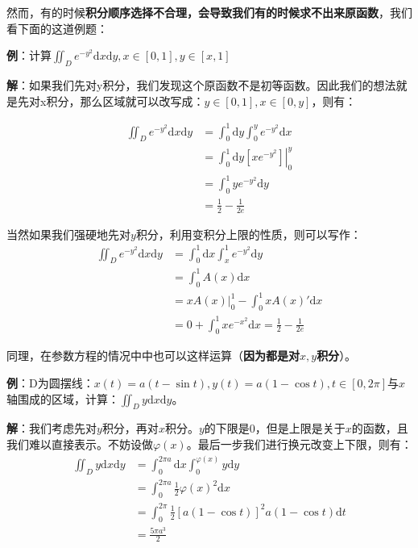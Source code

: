 \documentclass{ctexart}
\let\oldtextbf\textbf
\renewcommand{\textbf}[1]{\textcolor{brown!50!red}{\oldtextbf{#1}}}
\begin{document}
然而，有的时候\textbf{积分顺序选择不合理，会导致我们有的时候求不出来原函数}，我们看下面的这道例题：

\textbf{\color{brown!50!red}例}：计算$\iint_D e^{-y^2}\mathrm{d}x\mathrm{d}y,x\in[0,1],y\in[x,1]$

\textbf{\color{brown!50!red}解}：如果我们先对y积分，我们发现这个原函数不是初等函数。因此我们的想法就是先对x积分，那么区域就可以改写成：$y\in[0,1],x\in[0,y]$，则有：

\begin{align*}
    \iint_D e^{-y^2}\mathrm{d}x\mathrm{d}y&=\int_0^1\mathrm{d}y\int_0^y e^{-y^2}\mathrm{d}x\\
&=\left.\int_0^1\mathrm{d }y[xe^{-y^2}]\right|_0^y\\
&=\int_0^1 ye^{-y^2}\mathrm{d}y\\&=\frac{1}{2}-\frac{1}{2e}  
\end{align*}
\begin{tcolorbox}[
    colback=bac1,     %
    colframe=fra1,   %
    coltitle=white!80,    
    coltext=tex1,%
    title=另一种办法,
    fonttitle=\bfseries,        %
    arc=2mm                     %
]
当然如果我们强硬地先对$y$积分，利用变积分上限的性质，则可以写作：
\begin{align*}
    \iint_D e^{-y^2}\mathrm{d}x\mathrm{d}y&=\int_0^1\mathrm{d}x\int_x^1 e^{-y^2}\mathrm{d}y\\
&=\int_0^1 A(x)\mathrm{d}x \\
&=\left.xA(x)\right|_0^1-\int_0^1 xA(x)'\mathrm{d}x\\
&=0+\int_0^1xe^{-x^2}\mathrm{d}x= \frac{1}{2}-\frac{1}{2e}  
\end{align*}
\end{tcolorbox}


同理，在参数方程的情况中中也可以这样运算（\textbf{\color{brown!50!red}因为都是对$x,y$积分}）。

\textbf{\color{brown!50!red}例}：D为圆摆线：$x(t)=a(t-\sin t),y(t)=a(1-\cos t),t\in[0,2\pi]$与$x$轴围成的区域，计算：$\iint_D y\mathrm{d}x\mathrm{d}y$。

\textbf{\color{brown!50!red}解}：我们考虑先对$y$积分，再对$x$积分。$y$的下限是0，但是上限是关于$x$的函数，且我们难以直接表示。不妨设做$\varphi(x)$。最后一步我们进行换元改变上下限，则有：
\begin{align*}
    \iint_D y\mathrm{d}x\mathrm{d}y&=\int_0^{2\pi a}\mathrm{d}x\int_0^{\varphi(x)} y\mathrm{d}y\\
&=\int_0^{2\pi a}\frac{1}{2}\varphi(x)^2\mathrm{d}x\\   
&=\int_0^{2\pi} \frac{1}{2}[a(1-\cos t)]^2 a(1-\cos t)\mathrm{d}t\\
&=\frac{5\pi a^3}{2}   
\end{align*}
\end{document}
